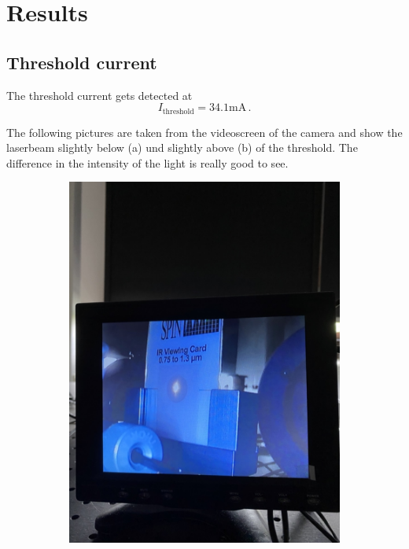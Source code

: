 \section{Results}

\subsection{Threshold current}
The threshold current gets detected at $$ I_{\text{threshold}} = 34.1 \text{mA} \, . $$

The following pictures are taken from the videoscreen of the camera and show the laserbeam slightly below (a) und 
slightly above (b) of the threshold. The difference in the intensity of the light is really good to see.

\begin{figure}
    \centering
    \begin{subfigure}[b]{0.45\textwidth}
        \centering
        \includegraphics[width=\textwidth]{beam1.jpeg}

\end{subfigure}
\end{figure}
